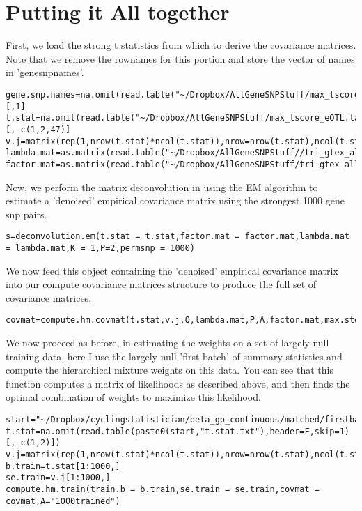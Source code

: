 \documentclass[10pt]{article}
\begin{document}
\section{Putting it All together}

First, we load the strong t statistics from which to derive the covariance matrices. Note that we remove the rownames for this portion and store the vector of names in 'genesnpnames'.

\begin{verbatim}
gene.snp.names=na.omit(read.table("~/Dropbox/AllGeneSNPStuff/max_tscore_eQTL.table.txt"))[,1]
t.stat=na.omit(read.table("~/Dropbox/AllGeneSNPStuff/max_tscore_eQTL.table.txt"))[,-c(1,2,47)]
v.j=matrix(rep(1,nrow(t.stat)*ncol(t.stat)),nrow=nrow(t.stat),ncol(t.stat))
lambda.mat=as.matrix(read.table("~/Dropbox/AllGeneSNPStuff//tri_gtex_allstrongt_lambda.out"))
factor.mat=as.matrix(read.table("~/Dropbox/AllGeneSNPStuff/tri_gtex_allstrongt_F.out"))
\end{verbatim}

Now, we perform the matrix deconvolution in using the EM algorithm to estimate a 'denoised' empirical covariance matrix using the strongest 1000 gene snp pairs.

\begin{verbatim}
s=deconvolution.em(t.stat = t.stat,factor.mat = factor.mat,lambda.mat = lambda.mat,K = 1,P=2,permsnp = 1000)
\end{verbatim}


We now feed this object containing the 'denoised' empirical covariance matrix into our compute covariance matrices structure to produce the full set of covariance matrices.

\begin{verbatim}
covmat=compute.hm.covmat(t.stat,v.j,Q,lambda.mat,P,A,factor.mat,max.step=s)
\end{verbatim}    

We now proceed as before, in estimating the weights on a set of largely null training data, here I use the largely null 'first batch' of summary statistics and compute the hierarchical mixture weights on this data. You can see that this function computes a matrix of likelihoods as described above, and then finds the optimal combination of weights to maximize this likelihood.


\begin{verbatim}
start="~/Dropbox/cyclingstatistician/beta_gp_continuous/matched/firstbatch"
t.stat=na.omit(read.table(paste0(start,"t.stat.txt"),header=F,skip=1)[,-c(1,2)])
v.j=matrix(rep(1,nrow(t.stat)*ncol(t.stat)),nrow=nrow(t.stat),ncol(t.stat))
b.train=t.stat[1:1000,]
se.train=v.j[1:1000,]
compute.hm.train(train.b = b.train,se.train = se.train,covmat = covmat,A="1000trained")
\end{verbatim}   
\end{document}
